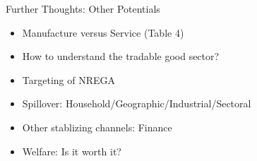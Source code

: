 \begin{frame}{Further Thoughts: Other Potentials}
    \begin{itemize}
        \item Manufacture versus Service (Table 4)
        \item How to understand the tradable good sector?
        \item Targeting of NREGA
        \item Spillover: Household/Geographic/Industrial/Sectoral
        \item Other stablizing channels: Finance
        \item Welfare: Is it worth it?
    \end{itemize}
\end{frame}